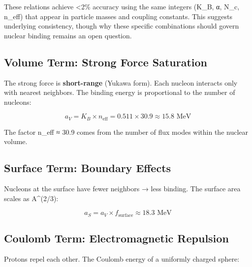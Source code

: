 \documentclass[
  11pt,
  letterpaper,
  twoside,
  openright]{book}
\begin{document}
\begin{tcolorbox}[enhanced jigsaw, coltitle=black, colbacktitle=quarto-callout-note-color!10!white, toprule=.15mm, colframe=quarto-callout-note-color-frame, arc=.35mm, opacityback=0, bottomtitle=1mm, toptitle=1mm, breakable, colback=white, titlerule=0mm, opacitybacktitle=0.6, title=\textcolor{quarto-callout-note-color}{\faInfo}\hspace{0.5em}{Consistency, Not Derivation}, rightrule=.15mm, bottomrule=.15mm, leftrule=.75mm, left=2mm]

These relations achieve \textless2\% accuracy using the same integers
(K\_B, α, N\_c, n\_eff) that appear in particle masses and coupling
constants. This suggests underlying consistency, though why these
specific combinations should govern nuclear binding remains an open
question.

\end{tcolorbox}

\subsection{Volume Term: Strong Force
Saturation}\label{volume-term-strong-force-saturation}

The strong force is \textbf{short-range} (Yukawa form). Each nucleon
interacts only with nearest neighbors. The binding energy is
proportional to the number of nucleons:

\[a_V = K_B \times n_{\text{eff}} = 0.511 \times 30.9 \approx 15.8 \text{ MeV}\]

The factor n\_eff ≈ 30.9 comes from the number of flux modes within the
nuclear volume.

\subsection{Surface Term: Boundary
Effects}\label{surface-term-boundary-effects}

Nucleons at the surface have fewer neighbors → less binding. The surface
area scales as A\^{}(2/3):

\[a_S = a_V \times f_{\text{surface}} \approx 18.3 \text{ MeV}\]

\subsection{Coulomb Term: Electromagnetic
Repulsion}\label{coulomb-term-electromagnetic-repulsion}

Protons repel each other. The Coulomb energy of a uniformly charged
sphere:
\end{document}
